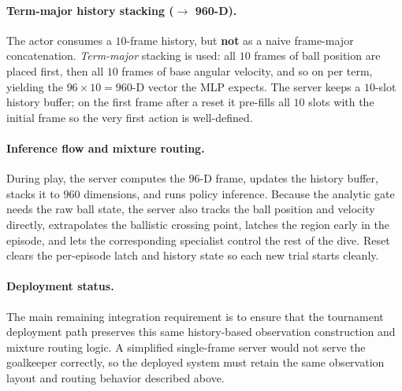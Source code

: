 \documentclass{article}
\begin{document}
\paragraph{Term-major history stacking ($\to$ 960-D).} The actor consumes a
$10$-frame history, but \textbf{not} as a naive frame-major concatenation.
\emph{Term-major} stacking is used: all $10$ frames of ball position are placed
first, then all $10$ frames of base angular velocity, and so on per term,
yielding the $96\times 10 = 960$-D
vector the MLP expects. The server keeps a $10$-slot history buffer; on the first
frame after a reset it pre-fills all $10$ slots with the initial frame so the
very first action is well-defined.

\paragraph{Inference flow and mixture routing.} During play, the server computes
the $96$-D frame, updates the history buffer, stacks it to $960$ dimensions, and
runs policy inference. Because the analytic gate needs the raw ball state, the
server also tracks the ball position and velocity directly, extrapolates the
ballistic crossing point, latches the region early in the episode, and lets the
corresponding specialist control the rest of the dive. Reset clears the
per-episode latch and history state so each new trial starts cleanly.

\paragraph{Deployment status.} The main remaining integration requirement is to
ensure that the tournament deployment path preserves this same history-based
observation construction and mixture routing logic. A simplified single-frame
server would not serve the goalkeeper correctly, so the deployed system must
retain the same observation layout and routing behavior described above.
\end{document}
